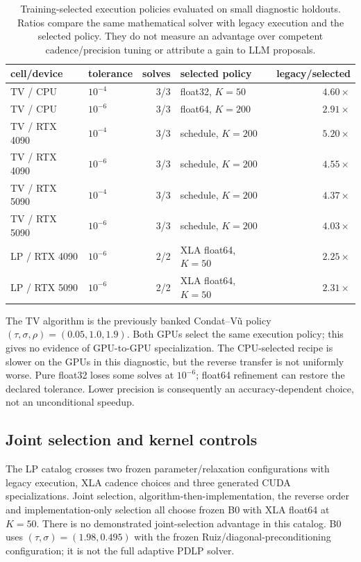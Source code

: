 \begin{table}[t]
\centering\small
\begin{tabular}{llrlr}
\toprule
cell/device & tolerance & solves & selected policy & legacy/selected \\
\midrule
TV / CPU & $10^{-4}$ & 3/3 & float32, $K=50$ & $4.60\times$ \\
TV / CPU & $10^{-6}$ & 3/3 & float64, $K=200$ & $2.91\times$ \\
TV / RTX 4090 & $10^{-4}$ & 3/3 & schedule, $K=200$ & $5.20\times$ \\
TV / RTX 4090 & $10^{-6}$ & 3/3 & schedule, $K=200$ & $4.55\times$ \\
TV / RTX 5090 & $10^{-4}$ & 3/3 & schedule, $K=200$ & $4.37\times$ \\
TV / RTX 5090 & $10^{-6}$ & 3/3 & schedule, $K=200$ & $4.03\times$ \\
LP / RTX 4090 & $10^{-6}$ & 2/2 & XLA float64, $K=50$ & $2.25\times$ \\
LP / RTX 5090 & $10^{-6}$ & 2/2 & XLA float64, $K=50$ & $2.31\times$ \\
\bottomrule
\end{tabular}
\caption{Training-selected execution policies evaluated on small diagnostic
holdouts. Ratios compare the same mathematical solver with legacy execution
and the selected policy. They do not measure an advantage over competent
cadence/precision tuning or attribute a gain to LLM proposals.}
\label{tab:tv-results}
\end{table}

The TV algorithm is the previously banked Condat--V\~u policy
$(\tau,\sigma,\rho)=(0.05,1.0,1.9)$. Both GPUs select the same execution
policy; this gives no evidence of GPU-to-GPU specialization. The CPU-selected
recipe is slower on the GPUs in this diagnostic, but the reverse transfer is
not uniformly worse. Pure float32 loses some solves at $10^{-6}$; float64
refinement can restore the declared tolerance. Lower precision is consequently
an accuracy-dependent choice, not an unconditional speedup.

\subsection{Joint selection and kernel controls}

The LP catalog crosses two frozen parameter/relaxation configurations with
legacy execution, XLA cadence choices and three generated CUDA specializations.
Joint selection, algorithm-then-implementation, the reverse order and
implementation-only selection all choose frozen B0 with XLA float64 at $K=50$.
There is no demonstrated joint-selection advantage in this catalog. B0 uses
$(\tau,\sigma)=(1.98,0.495)$ with the frozen Ruiz/diagonal-preconditioning
configuration; it is not the full adaptive PDLP solver.

